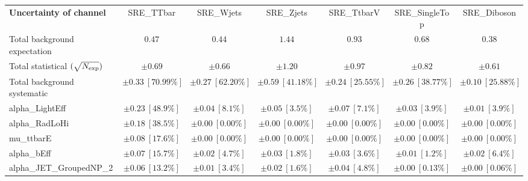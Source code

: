 
\begin{sidewaystable}
\begin{center}
\setlength{\tabcolsep}{0.0pc}
\begin{tabular*}{\textwidth}{@{\extracolsep{\fill}}lcccccc}
\noalign{\smallskip}\hline\noalign{\smallskip}
{\bf Uncertainty of channel}                                    & SRE\_TTbar            & SRE\_Wjets            & SRE\_Zjets            & SRE\_TtbarV            & SRE\_SingleTop            & SRE\_Diboson            \\
\noalign{\smallskip}\hline\noalign{\smallskip}
Total background expectation             &  $0.47$        &  $0.44$        &  $1.44$        &  $0.93$        &  $0.68$        &  $0.38$       \\
\noalign{\smallskip}\hline\noalign{\smallskip}
Total statistical $(\sqrt{N_{\rm exp}})$              & $\pm 0.69$        & $\pm 0.66$        & $\pm 1.20$        & $\pm 0.97$        & $\pm 0.82$        & $\pm 0.61$       \\
Total background systematic               & $\pm 0.33\ [70.99\%] $        & $\pm 0.27\ [62.20\%] $        & $\pm 0.59\ [41.18\%] $        & $\pm 0.24\ [25.55\%] $        & $\pm 0.26\ [38.77\%] $        & $\pm 0.10\ [25.88\%] $             \\
\noalign{\smallskip}\hline\noalign{\smallskip}
\noalign{\smallskip}\hline\noalign{\smallskip}
alpha\_LightEff         & $\pm 0.23\ [48.9\%] $          & $\pm 0.04\ [8.1\%] $          & $\pm 0.05\ [3.5\%] $          & $\pm 0.07\ [7.1\%] $          & $\pm 0.03\ [3.9\%] $          & $\pm 0.01\ [3.9\%] $       \\
alpha\_RadLoHi         & $\pm 0.18\ [38.5\%] $          & $\pm 0.00\ [0.00\%] $          & $\pm 0.00\ [0.00\%] $          & $\pm 0.00\ [0.00\%] $          & $\pm 0.00\ [0.00\%] $          & $\pm 0.00\ [0.00\%] $       \\
mu\_ttbarE         & $\pm 0.08\ [17.6\%] $          & $\pm 0.00\ [0.00\%] $          & $\pm 0.00\ [0.00\%] $          & $\pm 0.00\ [0.00\%] $          & $\pm 0.00\ [0.00\%] $          & $\pm 0.00\ [0.00\%] $       \\
alpha\_bEff         & $\pm 0.07\ [15.7\%] $          & $\pm 0.02\ [4.7\%] $          & $\pm 0.03\ [1.8\%] $          & $\pm 0.03\ [3.6\%] $          & $\pm 0.01\ [1.2\%] $          & $\pm 0.02\ [6.4\%] $       \\
alpha\_JET\_GroupedNP\_2         & $\pm 0.06\ [13.2\%] $          & $\pm 0.01\ [3.4\%] $          & $\pm 0.02\ [1.6\%] $          & $\pm 0.04\ [4.8\%] $          & $\pm 0.00\ [0.13\%] $          & $\pm 0.00\ [0.06\%] $       \\

\end{tabular*}
\end{center}
\end{sidewaystable}
